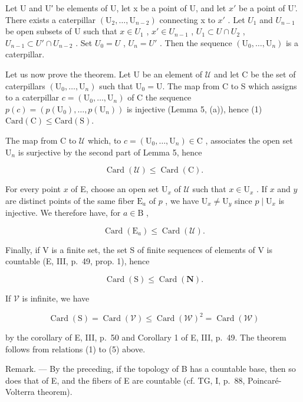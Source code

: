 Let U and U′ be elements of U, let x be a point of U, and let \(x'\) be a point of U'. There exists a caterpillar \((\mathrm{U}_{2},\ldots,\mathrm{U}_{n-2})\) connecting x to \(x'\) . Let \(U_{1}\) and \(U_{n-1}\) be open subsets of U such that \(x \in U_{1}\) , \(x' \in U_{n-1}\) , \(U_{1} \subset U \cap U_{2}\) , \(U_{n-1} \subset U' \cap U_{n-2}\) . Set \(U_{0} = U\) , \(U_{n} = U'\) . Then the sequence \((\mathrm{U}_{0},\ldots,\mathrm{U}_{n})\) is a caterpillar.

Let us now prove the theorem. Let U be an element of \(\mathcal{U}\) and let C be the set of caterpillars \((\mathrm{U}_0,\dots ,\mathrm{U}_n)\) such that \(\mathrm{U}_0 = \mathrm{U}\). The map from C to S which assigns to a caterpillar \(c = (\mathrm{U}_0,\dots ,\mathrm{U}_n)\) of C the sequence \(p(c) = (p(\mathrm{U}_{0}), \ldots, p(\mathrm{U}_{n}))\) is injective (Lemma 5, (a)), hence (1) \(\text{Card}(\mathrm{C}) \leqslant \text{Card}(\mathrm{S}).\)

The map from C to \(\mathcal{U}\) which, to \(c = (\mathrm{U}_0,\dots ,\mathrm{U}_n)\in \mathrm{C}\) , associates the open set \(\mathrm{U}_n\) is surjective by the second part of Lemma 5, hence

\[
\operatorname{Card} (\mathcal {U}) \leqslant \operatorname{Card} (\mathrm{C}).\tag{2}
\]

For every point \(x\) of E, choose an open set \(\mathrm{U}_x\) of \(\mathcal{U}\) such that \(x \in \mathrm{U}_x\) . If \(x\) and \(y\) are distinct points of the same fiber \(\mathrm{E}_a\) of \(p\) , we have \(\mathrm{U}_x \neq \mathrm{U}_y\) since \(p \mid \mathrm{U}_x\) is injective. We therefore have, for \(a \in \mathrm{B}\) ,

\[
\operatorname{Card} \left(\mathrm{E} _ {a}\right) \leqslant \operatorname{Card} (\mathcal {U}).\tag{3}
\]

Finally, if V is a finite set, the set S of finite sequences of elements of V is countable (E, III, p.~49, prop. 1), hence

\[
\operatorname{Card} (\mathrm{S}) \leqslant \operatorname{Card} (\mathbf {N}).\tag{4}
\]

If \(\mathcal{V}\) is infinite, we have

\[
\operatorname{Card} (\mathrm{S}) = \operatorname{Card} (\mathcal {V}) \leqslant \operatorname{Card} (\mathcal {W}) ^ {2} = \operatorname{Card} (\mathcal {W})\tag{5}
\]

by the corollary of E, III, p.~50 and Corollary 1 of E, III, p.~49. The theorem follows from relations (1) to (5) above.

Remark. --- By the preceding, if the topology of B has a countable base, then so does that of E, and the fibers of E are countable (cf. TG, I, p.~88, Poincaré-Volterra theorem).

